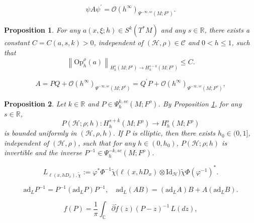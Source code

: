 \documentclass[10pt,a4paper]{amsart}
\newtheorem{proposition}{Proposition}
\newcommand\R{\ensuremath{\mathbb{R}}}
\begin{document}
\begin{equation}\label{disresi}
    \psi A \psi^{\prime}=\mathcal{O} (h^{\infty} )_{\Psi^{-\infty,sc}(M;F^\rho)}.
\end{equation}

\begin{proposition}\label{uniformboundedtheorem}
 For any $a(x, \xi ; h) \in S^k\left(T^* M\right)$ and any $s \in \mathbb{R}$, there exists a constant $C=C(a, s, k)>0$, independent of $( \mathcal{H},\rho) \in \mathcal{C}$ and $0<h\leq 1$, such that
\begin{equation}
\left\|\mathrm{Op}_h^\rho(a)\right\|_{H_h^s\left(M;F^{\rho}\right) \rightarrow H_h^{s-k}\left(M;F^{\rho}\right)} \leq C .
\end{equation}
\end{proposition}

\begin{equation}\label{ellipticparametrix}
A=PQ+\mathcal{O}(h^{\infty})_{\Psi^{-\infty,sc}(M;F^\rho)}=Q^{\prime}P+\mathcal{O}(h^{\infty})_{\Psi^{-\infty,sc}(M;F^\rho)},
\end{equation}

\begin{proposition}\label{inverseofelliptic}
Let $k\in \R$ and $P \in \Psi_{h}^{k,sc}(M;F^\rho)$. By Proposition \ref{uniformboundedtheorem}, for any $s\in \R$,
\begin{equation*}
    P(\mathcal{H};\rho;h):H^{s+k}_h(M;F^\rho) \rightarrow H^{s}_h(M;F^\rho) 
\end{equation*}
is bounded uniformly in $(\mathcal{H},\rho,h)$. If $P$ is elliptic, then there exists $h_0\in (0,1]$, independent of $(\mathcal{H},\rho)$, such that for any $h\in (0,h_0)$, 
$P(\mathcal{H};\rho;h)$ is invertible and the inverse
 $P^{-1} \in \Psi_{h}^{-k,sc}(M;F^\rho)$.
\end{proposition}

\begin{equation*}\label{linearsymbol}
L_{\ell(x,hD_{x}),\widetilde{\chi}}:=\varphi^*\Phi^{-1}\widetilde{\chi} \big(\ell(x,hD_{x})\otimes \mathrm{Id}_{\mathcal{H}} \big) \widetilde{\chi}\Phi(\varphi^{-1})^* .
\end{equation*}

\begin{equation}\label{propofad}
\mathrm{ad}_{L}P^{-1}=P^{-1}(\mathrm{ad}_{L}P)P^{-1},\quad \mathrm{ad}_{L}(AB)=(\mathrm{ad}_{L}A)B+A(\mathrm{ad}_{L}B).
\end{equation}

\begin{equation}\label{HSformula}
f(P)= \frac{1}{\pi } \int_{\mathbb{C}} \overline{\partial} \widetilde{f}(z)(P-z)^{-1} \,L(d z),
\end{equation}
\end{document}

